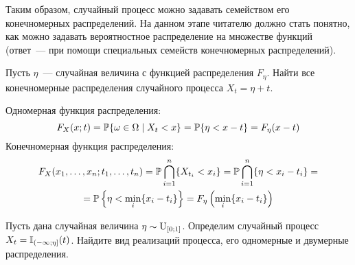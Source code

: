 Таким образом, случайный процесс можно задавать семейством его конечномерных распределений.
На данном этапе читателю должно стать понятно,
как можно задавать вероятностное распределение на множестве функций
(ответ~--- при помощи специальных семейств конечномерных распределений).

\begin{Exercise}[counter=SecExercise, label={exercise:basics:rv_plus_t}]
    \noindent
    Пусть $ \eta $~--- случайная величина с функцией распределения $ F_\eta $.
    Найти все конечномерные распределения случайного процесса $ X_t = \eta + t $.
\end{Exercise}

\begin{Answer}
    \noindent
    Одномерная функция распределения:
    \[
        F_X(x; t) = \mathbb{P} \{ \omega \in \Omega \mid X_t < x \} = \mathbb{P} \{ \eta < x - t \} = F_\eta(x - t)
    \]
    Конечномерная функция распределения:
    \begin{multline*}
        F_X(x_1, \ldots, x_n; t_1, \ldots, t_n) = \mathbb{P} \bigcap_{i = 1}^n \{ X_{t_i} < x_i \} = \mathbb{P} \bigcap_{i = 1}^n \{ \eta < x_i - t_i \} = \\
        = \mathbb{P} \left\{ \eta < \min_i \{x_i - t_i\} \right\} = F_\eta \left(\min_i \{x_i - t_i \} \right)
    \end{multline*}
\end{Answer}

\begin{Exercise}[counter=SecExercise, label={exercise:basics:random_point_om_segment}]
    \noindent
    Пусть дана случайная величина $ \eta \sim \textnormal{U}_{[0;1]} $.
    Определим случайный процесс $ X_t = \mathbb{I}_{(-\infty; \eta]}(t) $.
    Найдите вид реализаций процесса, его одномерные и двумерные распределения.
\end{Exercise}

